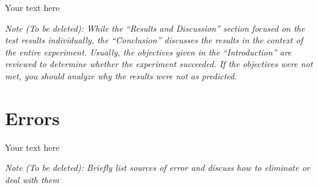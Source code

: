 \documentclass[10pt]{article}
\begin{document}
Your text here

\medskip

\textit{Note (To be deleted): While the ``Results and Discussion'' section focused on the test results individually, the ``Conclusion'' discusses the results in the context of the entire experiment. Usually, the objectives given in the ``Introduction'' are reviewed to determine whether the experiment succeeded. If the objectives were not met, you should analyze why the results were not as predicted.}

\section{Errors}

Your text here

\medskip

\textit{Note (To be deleted): Briefly list sources of error and discuss how to eliminate or deal with them}
\end{document}
